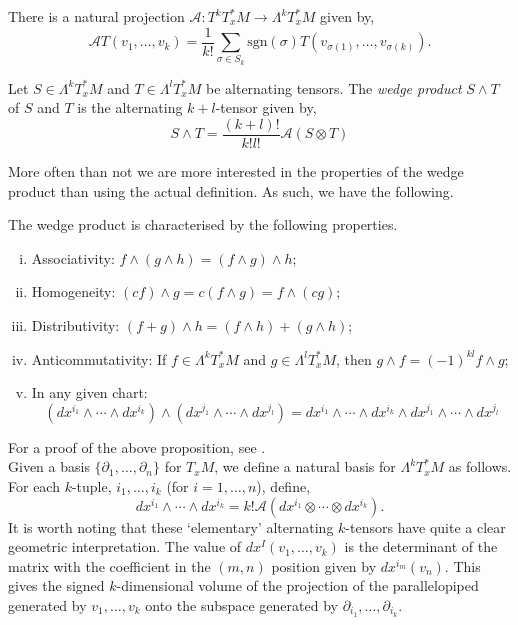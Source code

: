 There is a natural projection $\mathcal{A}:T^kT^*_xM\to\Lambda^kT^*_xM$ given by,
\[
\mathcal{A}T(v_1,\ldots,v_k)=\frac{1}{k!}\sum_{\sigma\in S_k}\mathrm{sgn}(\sigma)T(v_{\sigma(1)},\ldots,v_{\sigma(k)}).
\]
\begin{definition}
Let $S\in\Lambda^kT^*_xM$ and $T\in\Lambda^lT^*_xM$ be alternating tensors. The \textit{wedge product} $S\wedge T$ of $S$ and $T$ is the alternating $k+l$-tensor given by,
\[
S\wedge T=\frac{(k+l)!}{k!l!}\mathcal{A}(S\otimes T)
\]
\end{definition}
More often than not we are more interested in the properties of the wedge product than using the actual definition. As such, we have the following.
\begin{proposition}
The wedge product is characterised by the following properties.
\begin{enumerate}[(i)]
\item Associativity: $f\wedge(g\wedge h)=(f\wedge g)\wedge h$;
\item Homogeneity: $(cf)\wedge g=c(f\wedge g)=f\wedge(cg)$;
\item Distributivity: $(f+g)\wedge h=(f\wedge h)+(g\wedge h)$;
\item Anticommutativity: If $f\in\Lambda^kT^*_xM$ and $g\in\Lambda^l T^*_xM$, then $g\wedge f=(-1)^{kl}f\wedge g$;
\item In any given chart: \[(dx^{i_1}\wedge\cdots\wedge dx^{i_k})\wedge(dx^{j_1}\wedge\cdots\wedge dx^{j_l})=dx^{i_1}\wedge\cdots\wedge dx^{i_k}\wedge dx^{j_1}\wedge\cdots\wedge dx^{j_l} \]
\end{enumerate}
\end{proposition}
For a proof of the above proposition, see \cite{andrews}.\\

Given a basis $\{\partial_1,\ldots,\partial_n\}$ for $T_xM$, we define a natural basis for $\Lambda^kT^*_xM$ as follows. For each $k$-tuple, $i_1,\ldots,i_k$ (for $i=1,\ldots,n$), define,
\[
dx^{i_1}\wedge\cdots\wedge dx^{i_k}=k!\mathcal{A}(dx^{i_1}\otimes\cdots\otimes dx^{i_k}).
\]
It is worth noting that these `elementary' alternating $k$-tensors have quite a clear geometric interpretation. The value of $dx^I(v_1,\ldots,v_k)$ is the determinant of the matrix with the coefficient in the $(m,n)$ position given by $dx^{i_m}(v_n)$. This gives the signed $k$-dimensional volume of the projection of the parallelopiped generated by $v_1,\ldots,v_k$ onto the subspace generated by $\partial_{i_1},\ldots,\partial_{i_k}$.\\

